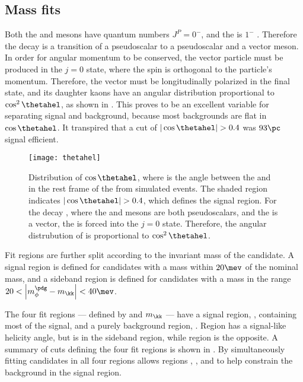 \subsection{Mass fits}
\label{sec:dsphi:fit}
Both the \Bp and \Ds mesons have quantum numbers $J^P=0^-$, and the \phii is $1^-$ .
Therefore the decay \btodsphi is a transition of a pseudoscalar to a pseudoscalar and a vector
meson.
In order for angular momentum to be conserved, the vector particle must be produced in the $j=0$
state, where the spin is orthogonal to the particle's momentum.
Therefore, the vector \phii must be longitudinally polarized in the final
state, and its daughter kaons have an angular distribution proportional to $\cos^2\thetahel$, as
shown in .
This proves to be an excellent variable for separating signal and background, because most
backgrounds are flat in $\cos\thetahel$.
It transpired that a cut of $|\cos\thetahel|>0.4$ was $93\pc$ signal efficient.

\begin{figure}
  \begin{center}
    \texttt{[image: thetahel]}
    \caption[Simulated distribution of the helicity angle of the \phii]
    {
      Distribution of $\cos\thetahel$, where \thetahel is the angle between the \Bp and \Kp in the
      rest frame of the \phii from simulated events.
      The shaded region indicates $|\cos\thetahel|>0.4$, which defines the signal region.
      For the decay \btodsphi, where the \Bp and \Ds mesons are both pseudoscalars, and the
      \phii is a vector, the \phii is forced into the $j=0$ state.
      Therefore, the angular distrubution of \thetahel is proportional to $\cos^2\thetahel$.
    }
    \label{fig:dsphi:hel}
  \end{center}
\end{figure}

Fit regions are further split according to the invariant mass of the \phii candidate.
A signal region is defined for \phitokk candidates with a mass within $20\mev$ of the nominal \phii
mass, and a sideband region is defined for candidates with a mass in the range
\mbox{$20<\left|m_\phi^\pdg-m_\kk\right|<40\mev$}.

The four fit regions --- defined by \thetahel and $m_{\kk}$ --- have a signal region, \rA,
containing most of the signal, and a purely background region, \rD.
Region \rB has a signal-like helicity angle, but is in the \phii sideband region, while region \rC
is the opposite.
A summary of cuts defining the four fit regions is shown in .
By simultaneously fitting \btodsphi candidates in all four regions allows regions \rB, \rC, and \rD
to help constrain the background in the signal region.

